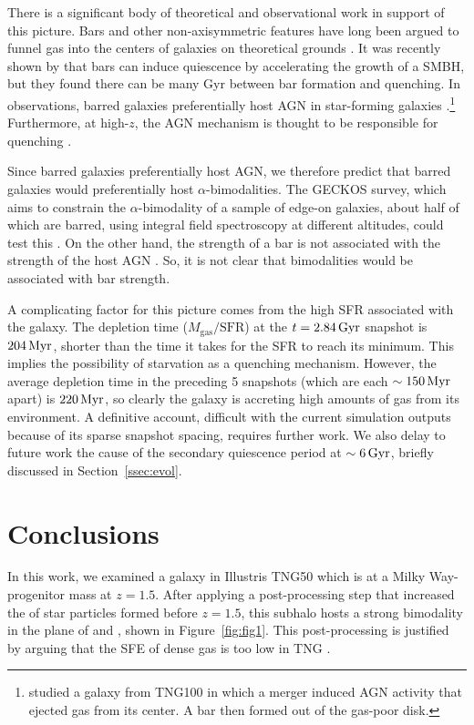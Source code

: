 There is a significant body of theoretical and observational work in support of this picture. Bars and other non-axisymmetric features have long been argued to funnel gas into the centers of galaxies on theoretical grounds \citep{1989Natur.338...45S,2010MNRAS.407.1529H}. It was recently shown by \citet{2024arXiv240906783F} that bars can induce quiescence by accelerating the growth of a SMBH, but they found there can be many Gyr between bar formation and quenching. In observations, barred galaxies preferentially host AGN in star-forming galaxies \citep{2012ApJS..198....4O,2022A&A...661A.105S}.\footnote{\citet{2022A&A...668L...3L} studied a galaxy from TNG100 in which a merger induced AGN activity that ejected gas from its center. A bar then formed out of the gas-poor disk.} Furthermore, at high-$z$, the AGN mechanism is thought to be responsible for quenching \citep[e.g.][and references therein]{2023arXiv230806317D,2024arXiv240417945P,2024ApJ...968L..21M,2024Natur.630...54B}.

Since barred galaxies preferentially host AGN, we therefore predict that barred galaxies would preferentially host $\alpha$-bimodalities. The GECKOS survey, which aims to constrain the $\alpha$-bimodality of a sample of edge-on galaxies, about half of which are barred, using integral field spectroscopy at different altitudes, could test this \citep[and J. v.~d.~Sande, private communication]{2024IAUS..377...27V}. On the other hand, the strength of a bar is not associated with the strength of the host AGN \citep[e.g.]{2022A&A...661A.105S}. So, it is not clear that bimodalities would be associated with bar strength.

A complicating factor for this picture comes from the high SFR associated with the galaxy. The depletion time ($M_{\textrm{gas}}/\textrm{SFR}$) at the $t=2.84\,\textrm{Gyr}$ snapshot is $204\,\textrm{Myr}$, shorter than the time it takes for the SFR to reach its minimum. This implies the possibility of starvation as a quenching mechanism. However, the average depletion time in the preceding 5 snapshots (which are each $\sim150\,\textrm{Myr}$ apart) is $220\,\textrm{Myr}$, so clearly the galaxy is accreting high amounts of gas from its environment. A definitive account, difficult with the current simulation outputs because of its sparse snapshot spacing, requires further work. We also delay to future work the cause of the secondary quiescence period at $\sim6\,\textrm{Gyr}$, briefly discussed in Section~\ref{ssec:evol}.

\section{Conclusions}\label{sec:conc}
In this work, we examined a galaxy in Illustris TNG50 which is at a Milky Way-progenitor mass at $z=1.5$. After applying a post-processing step that increased the \MgFe{} of star particles formed before $z=1.5$, this subhalo hosts a strong bimodality in the plane of \MgFe{} and \FeH{}, shown in Figure~\ref{fig:fig1}. This post-processing is justified by arguing that the SFE of dense gas is too low in TNG \citep[][see discussion in our Section~\ref{ssec:sfe}]{2024arXiv240909121H}.

